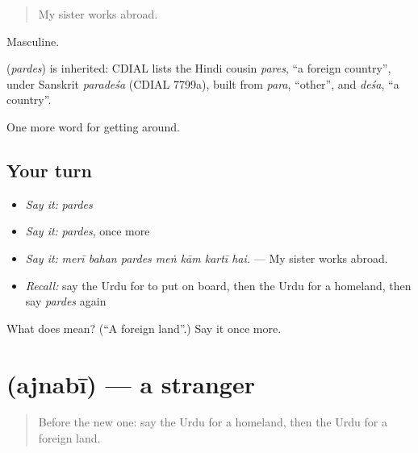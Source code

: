 \begin{quote}
My sister works abroad.
\end{quote}

Masculine.

\begin{cousinweb}
\textbf{} (\emph{pardes}) is inherited: CDIAL lists the Hindi cousin \emph{pares}, \textquotedblleft{}a foreign country\textquotedblright{}, under Sanskrit \emph{paradeśa} (CDIAL 7799a), built from \emph{para}, \textquotedblleft{}other\textquotedblright{}, and \emph{deśa}, \textquotedblleft{}a country\textquotedblright{}.
\end{cousinweb}

\begin{grammarlens}[title={What you've built}]
One more word for getting around.
\end{grammarlens}

\subsection*{Your turn}
\begin{itemize}
\raggedright
  \item \emph{Say it:} \emph{pardes}
  \item \emph{Say it:} \emph{pardes}, once more
  \item \emph{Say it:} \emph{merī bahan pardes meṅ kām kartī hai.} — My sister works abroad.
  \item \emph{Recall:} say the Urdu for to put on board, then the Urdu for a homeland, then say \emph{pardes} again
\end{itemize}

\begin{tcolorbox}[breakable,colback=teal!4,colframe=teal!35!black,title={Before you move on}]
What does  mean? (\textquotedblleft{}A foreign land\textquotedblright{}.) Say it once more.
\end{tcolorbox}
\section[\texorpdfstring{\ur{اجنبی} (ajnabī)}{اجنبی (ajnabī)}]{ (ajnabī) — a stranger}

\label{lesson:UR-C400-ajnabi}



\begin{quote}
Before the new one: say the Urdu for a homeland, then the Urdu for a foreign land.
\end{quote}

